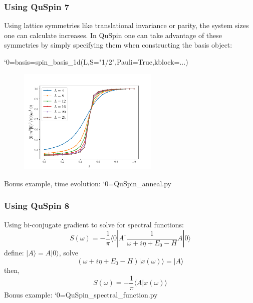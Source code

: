 \documentclass{beamer}
\newcommand\0{\scalebox{-1}[1]{0}}
\let\svttfamily\ttfamily
\renewcommand\ttfamily{\svttfamily\catcode`0=\active }
\renewcommand\texttt{\bgroup\ttfamily\texttthelp}
\def\texttthelp#1{#1\egroup}
\begin{document}
\begin{frame}
\frametitle{Using QuSpin 7}
Using lattice symmetries like translational invariance or parity, the system sizes one can calculate increases. In QuSpin one can take advantage of these symmetries by simply specifying them when constructing the basis object:

\texttt{basis=spin\_basis\_1d(L,S="1/2",Pauli=True,kblock=...)}
\begin{figure}
\includegraphics[width=0.6\textwidth]{anc/B.pdf}
\end{figure}
Bonus example, time evolution: \texttt{QuSpin\_anneal.py}
\end{frame}



\begin{frame}
	\frametitle{Using QuSpin 8}
	Using bi-conjugate gradient to solve for spectral functions:
	\begin{equation*}
		S(\omega) = -\frac{1}{\pi}\langle 0 |A^\dagger \frac{1}{\omega+i\eta+E_0-H} A|0\rangle
	\end{equation*}
	define: $|A\rangle = A|0\rangle$, solve
	\begin{equation}
		(\omega+i\eta+E_0-H)|x(\omega)\rangle = |A\rangle
	\end{equation}
	then,
	\begin{equation}
		S(\omega) = -\frac{1}{\pi}\langle A|x(\omega)\rangle
	\end{equation}
	Bonus example: \texttt{QuSpin\_spectral\_function.py}
	
	
\end{frame}
\end{document}
